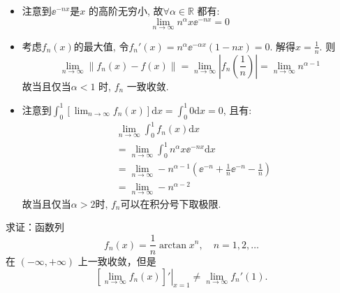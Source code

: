 \begin{solution}
    \begin{itemize}
        \item 注意到\(\ee^{-nx}\)是\(x\) 的高阶无穷小, 故\(\forall \alpha
            \in \mathbb{R}\) 都有: \[
                \lim_{n \to \infty} n^{\alpha} x \ee^{-n x} = 0
            \]
        \item 考虑\(f_{n}(x)\)的最大值, 令\(f_{n}'(x) = n^{\alpha}
            \ee^{-\alpha x} (1 - n x) = 0\). 解得\(x =
            \frac{1}{n}\).
            则\[
                \lim_{n \to \infty} \left\lVert f_{n}(x) - f(x)
                \right\rVert = \lim_{n \to \infty} \left|
                f_{n}\left(\frac{1}{n}\right) \right| = \lim_{n \to
                \infty} n^{\alpha - 1}
            \]
            故当且仅当\(\alpha <  1\) 时, \(f_{n}\) 一致收敛.
        \item 注意到\(\int_0^1 \left[ \lim_{n \to \infty} f_n(x) \right]
            \mathrm{d}x = \int_0^1 0 \mathrm{d}x = 0\), 且有:
            \begin{align*}
                & \lim_{n \to \infty} \int_0^1 f_n(x) \mathrm{d}x \\
                & = \lim_{n \to \infty} \int_{0}^{1} n^{\alpha} x
                \ee^{-nx} \mathrm{d}x                       \\
                & = \lim_{n \to \infty} -n^{\alpha - 1} \left(
                    \ee^{-n} + \frac{1}{n}\ee^{-n}
                -\frac{1}{n} \right)                               \\
                & = \lim_{n \to \infty} -n^{\alpha - 2}
            \end{align*}
            故当且仅当\(\alpha > 2\)时, \(f_{n}\)可以在积分号下取极限.
    \end{itemize}
\end{solution}

\begin{problem}
    求证：函数列
    \[
        f_n(x) = \frac{1}{n} \arctan x^n, \quad n = 1, 2, \ldots
    \]
    在 \((-\infty, +\infty)\) 上一致收敛，但是
    \[
        \left. \left[ \lim_{n \to \infty} f_n(x) \right]' \right|_{x = 1}
        \neq \lim_{n \to \infty} f_n'(1).
    \]
\end{problem}

